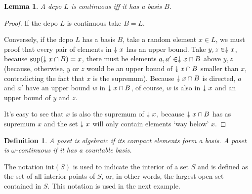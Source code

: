 \documentclass[a4paper,12pt]{article}
\newcommand{\downdownarrow}{\mathrel{\reflectbox{\rotatebox[origin=c]{90}{$\twoheadleftarrow$}}}}
\newtheorem{lemma}[theorem]{Lemma}
\newtheorem{definition}[theorem]{Definition}
\renewcommand{\int}{\text{int}}
\begin{document}
\begin{lemma}
A dcpo $L$ is continuous iff it has a basis $B$.
\end{lemma}
\begin{proof}
If the dcpo $L$ is continuous take $B = L$. 

Conversely, if the dcpo $L$ has a basis $B$, take a random element $x \in L$, we must proof that every pair of elements in $\downdownarrow x$ has an upper bound. Take $y, z \in \downdownarrow x$,  because $\sup(\downdownarrow x \cap B) = x$, there must be elements $a, a' \in \downdownarrow x \cap B$ above $y, z$ (because, otherwise, $y$ or $z$ would be an upper bound of $\downdownarrow x \cap B$  smaller than $x$, contradicting the fact that $x$ is the supremum). Because $\downdownarrow x \cap B$ is directed, $a$ and $a'$ have an upper bound $w$ in $\downdownarrow x \cap B$, of course, $w$ is also in $\downdownarrow x$ and an upper bound of $y$ and $z$. 
 
 It's easy to see that $x$ is also the supremum of $\downdownarrow x$, because $\downdownarrow x \cap B$ has as supremum $x$ and the set $ \downdownarrow x$ will only contain elements `way below' $x$.
\end{proof}

\begin{definition}
A poset is \emph{algebraic} if its compact elements form a basis. A poset is \emph{$\omega$-continuous} if it has a countable basis.
\end{definition}

The notation $\int(S)$ is used to indicate the interior of a set $S$ and is defined as the set of all interior points of $S$, or, in other words, the largest  open set contained in $S$. This notation is used in the next example.
\end{document}
